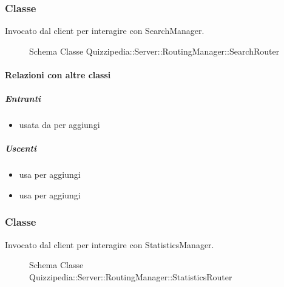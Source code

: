 \subsubsection{Classe }
Invocato dal client per interagire con SearchManager.
\begin{figure}[H]
\centering
\noindent{}
\caption[Schema Classe SearchRouter]{Schema Classe Quizzipedia::Server::RoutingManager::SearchRouter}
\end{figure}
\paragraph{Relazioni con altre classi}
\subparagraph{Entranti}
\begin{itemize}
\item usata da  per aggiungi
\end{itemize}
\subparagraph{Uscenti}
\begin{itemize}
\item usa  per aggiungi
\item usa  per aggiungi
\end{itemize}
\subsubsection{Classe }
Invocato dal client per interagire con StatisticsManager.
\begin{figure}[H]
\centering
\noindent{}
\caption[Schema Classe StatisticsRouter]{Schema Classe Quizzipedia::Server::RoutingManager::StatisticsRouter}
\end{figure}
